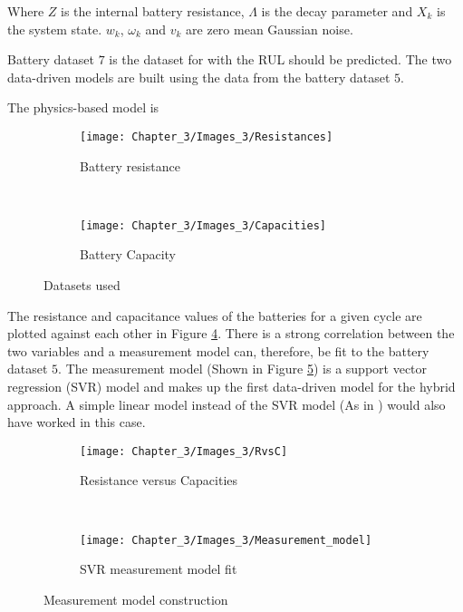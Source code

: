 Where $Z$ is the internal battery resistance, $\Lambda$ is the decay parameter and $X_{k}$ is the system state. $w_{k}$, $\omega_{k}$  and $ v_{k}$ are zero mean Gaussian noise. 

Battery dataset $7$ is the dataset for with the RUL should be predicted.  The two data-driven models are built using the data from the battery dataset $5$. 

The physics-based model is 

\begin{figure}[H]
	\centering
	\begin{subfigure}{0.49\textwidth}
		\texttt{[image: Chapter\_3/Images\_3/Resistances]}
		\caption{Battery resistance}
		\label{F:Resistance}
	\end{subfigure}
	~
	\begin{subfigure}{0.49\textwidth}
		\texttt{[image: Chapter\_3/Images\_3/Capacities]}
		\caption{Battery Capacity}
		\label{F:Capacities}
	\end{subfigure}
	
	\caption{Datasets used}
	\label{F:Dataset}
\end{figure}

The resistance and capacitance values of the batteries for a given cycle are plotted against each other in Figure \ref{F:RvC}. There is a strong correlation between the two variables and a measurement model can, therefore, be fit to the battery dataset $5$. The measurement model (Shown in Figure \ref{F:SVR}) is a support vector regression (SVR) model and makes up the first data-driven model for the hybrid approach. A simple linear model instead of the SVR model (As in \cite{Liao2016}) would also have worked in this case.  

\begin{figure}[H]
	\centering
	\begin{subfigure}{0.49\textwidth}
		\texttt{[image: Chapter\_3/Images\_3/RvsC]}
		\caption{Resistance versus Capacities}
		\label{F:RvC}
	\end{subfigure}
	~
	\begin{subfigure}{0.49\textwidth}
		\texttt{[image: Chapter\_3/Images\_3/Measurement\_model]}
		\caption{SVR measurement model fit}
		\label{F:SVR}
	\end{subfigure}
	
	\caption{Measurement model construction}
	\label{F:Measurement}
\end{figure}


